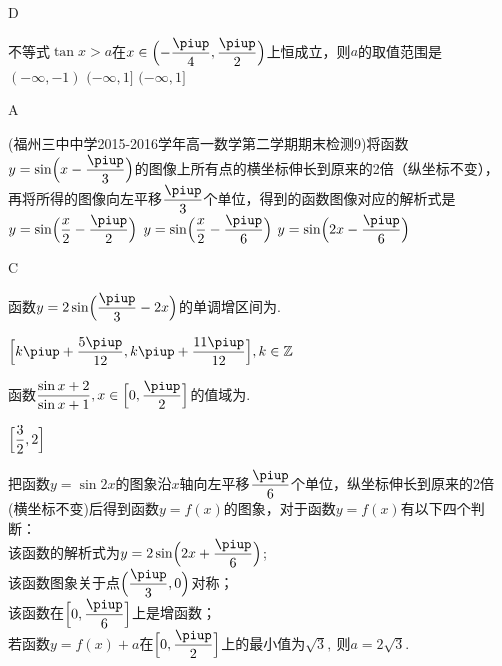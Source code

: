 \begin{exercise}
      \begin{answer}
        D
      \end{answer}
    \item%
      不等式$\tan x>a$在$x\in\Bigl(-\dfrac{\piup}4,\dfrac{\piup}2 \Bigr)$上恒成立，则$a$的取值范围是\xz
      \xx{$(-\infty,-1]$}
        {$(-\infty,-1)$}
        {$(-\infty,1]$}
        {$(-\infty,1]$}
      \begin{answer}
        A
      \end{answer}
    \item%
      (福州三中中学2015-2016学年高一数学第二学期期末检测9)将函数$y=\sin\Bigl(x-\dfrac{\piup}3\Bigr)$的图像上所有点的横坐标伸长到原来的2倍（纵坐标不变），再将所得的图像向左平移$\dfrac{\piup}3$个单位，得到的函数图像对应的解析式是\xz
        {$y=\sin\Bigl(\dfrac x2-\dfrac{\piup}2\Bigr)$}
        {$y=\sin\Bigl(\dfrac{x}2-\dfrac{\piup}6\Bigr)$}
        {$y=\sin\Bigl(2x-\dfrac{\piup}6\Bigr)$}
      \begin{answer}
        C
      \end{answer}
    \item%
      函数$y=2\sin\Bigl(\dfrac{\piup}3-2x \Bigr)$的单调增区间为\tk.
      \begin{answer}
        $\Bigl[k\piup+\dfrac{5\piup}{12},k\piup+\dfrac{11\piup}{12} \Bigr],k\in\mathbb{Z}$
      \end{answer}
    \item%
      函数$\dfrac{\sin x+2}{\sin x+1},x\in\Bigl[0,\dfrac{\piup}2\Bigr]$的值域为\tk.
      \begin{answer}
        $\Bigl[\dfrac32,2\Bigr]$
      \end{answer}
    \item%
      把函数$ y=\sin 2x $的图象沿$x$轴向左平移$ \dfrac{\piup}{6} $个单位，纵坐标伸长到原来的2倍(横坐标不变)后得到函数$ y=f(x) $的图象，对于函数$ y=f(x) $有以下四个判断：\\
       该函数的解析式为$ y=2\sin \Bigl(2x+\dfrac{\piup}{6}\Bigr) $;\\
       该函数图象关于点$ \Bigl(\dfrac{\piup}{3},0\Bigr) $对称；\\
       该函数在$ \Bigl[0,\dfrac{\piup}{6}\Bigr] $上是增函数；\\
       若函数$ y=f(x)+a $在$ \Bigl[0,\dfrac{\piup}{2}\Bigr] $上的最小值为$ \sqrt{3},\  $则$ a=2\sqrt{3} .$\\

\end{exercise}
